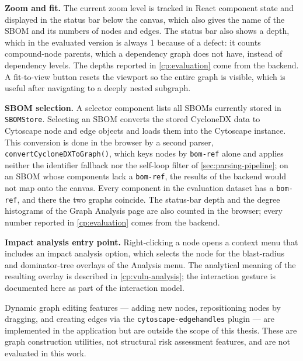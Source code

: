 \textbf{Zoom and fit.} The current zoom level is tracked in React component state and displayed in the status bar below the canvas, which also gives the name of the SBOM and its numbers of nodes and edges. The status bar also shows a depth, which in the evaluated version is always 1 because of a defect: it counts compound-node parents, which a dependency graph does not have, instead of dependency levels. The depths reported in \autoref{cp:evaluation} come from the backend. A fit-to-view button resets the viewport so the entire graph is visible, which is useful after navigating to a deeply nested subgraph.

\textbf{SBOM selection.} A selector component lists all SBOMs currently stored in \texttt{SBOMStore}. Selecting an SBOM converts the stored CycloneDX data to Cytoscape node and edge objects and loads them into the Cytoscape instance. This conversion is done in the browser by a second parser, \texttt{convertCycloneDXToGraph()}, which keys nodes by \texttt{bom-ref} alone and applies neither the identifier fallback nor the self-loop filter of \autoref{sec:parsing-pipeline}; on an SBOM whose components lack a \texttt{bom-ref}, the results of the backend would not map onto the canvas. Every component in the evaluation dataset has a \texttt{bom-ref}, and there the two graphs coincide. The status-bar depth and the degree histograms of the Graph Analysis page are also counted in the browser; every number reported in \autoref{cp:evaluation} comes from the backend.

\textbf{Impact analysis entry point.} Right-clicking a node opens a context menu that includes an impact analysis option, which selects the node for the blast-radius and dominator-tree overlays of the Analysis menu. The analytical meaning of the resulting overlay is described in \autoref{cp:vuln-analysis}; the interaction gesture is documented here as part of the interaction model.

Dynamic graph editing features --- adding new nodes, repositioning nodes by dragging, and creating edges via the \texttt{cytoscape-edgehandles} plugin --- are implemented in the application but are outside the scope of this thesis. These are graph construction utilities, not structural risk assessment features, and are not evaluated in this work.
